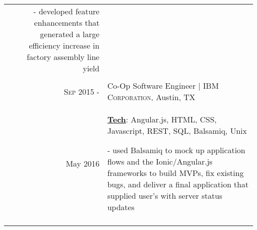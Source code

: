 \documentclass[a4paper,10pt]{article}
\begin{document}
\begin{tabular}{r|p{12cm}}
{	- developed feature enhancements that generated a large efficiency increase in factory assembly line yield
} \\
 \multicolumn{2}{c}{} \\
 
 \textsc{Sep 2015 -} & Co-Op Software Engineer | \textsc{IBM Corporation}, Austin, TX \\
 May 2016 & \small{
 	\textbf{\underline{Tech}}: Angular.js, HTML, CSS, Javascript, REST, SQL, Balsamiq, Unix}
 
	\tiny{
	\vphantom{a}
	}
	
	\small{
 	- used Balsamiq to mock up application flows and the Ionic/Angular.js frameworks to build MVPs, fix existing bugs, and deliver a final application that supplied user’s with server status updates
 } \\
 \multicolumn{2}{c}{} \\
\end{tabular}
\end{document}
